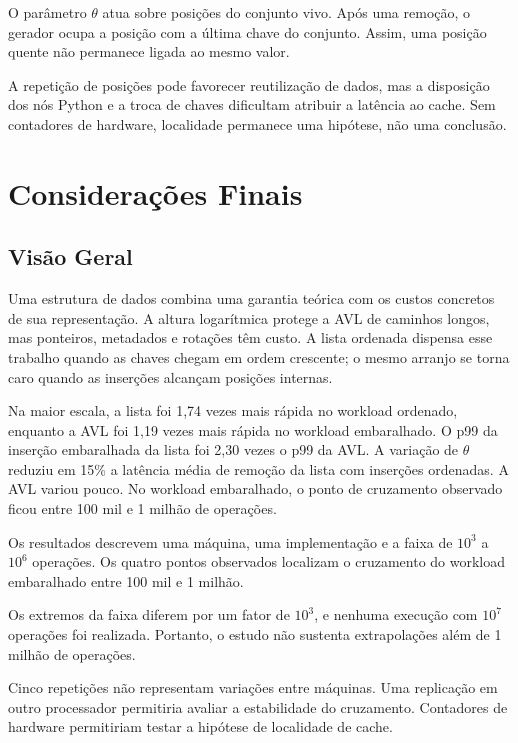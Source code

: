 \documentclass[12pt]{article}
\begin{document}
{O parâmetro $\theta$ atua sobre posições do conjunto vivo. Após uma remoção, o gerador ocupa a posição com a última chave do conjunto. Assim, uma posição quente não permanece ligada ao mesmo valor.}

{A repetição de posições pode favorecer reutilização de dados, mas a disposição dos nós Python e a troca de chaves dificultam atribuir a latência ao cache. Sem contadores de hardware, localidade permanece uma hipótese, não uma conclusão.}

\section{Considerações Finais}\label{sec:conclusion}

\subsection{Visão Geral}\label{sec:conclusion:overview}

{Uma estrutura de dados combina uma garantia teórica com os custos concretos de sua representação. A altura logarítmica protege a AVL de caminhos longos, mas ponteiros, metadados e rotações têm custo. A lista ordenada dispensa esse trabalho quando as chaves chegam em ordem crescente; o mesmo arranjo se torna caro quando as inserções alcançam posições internas.}

{Na maior escala, a lista foi 1,74 vezes mais rápida no workload ordenado, enquanto a AVL foi 1,19 vezes mais rápida no workload embaralhado. O p99 da inserção embaralhada da lista foi 2,30 vezes o p99 da AVL. A variação de $\theta$ reduziu em 15\% a latência média de remoção da lista com inserções ordenadas. A AVL variou pouco. No workload embaralhado, o ponto de cruzamento observado ficou entre 100 mil e 1 milhão de operações.}

{Os resultados descrevem uma máquina, uma implementação e a faixa de $10^3$ a $10^6$ operações. Os quatro pontos observados localizam o cruzamento do workload embaralhado entre 100 mil e 1 milhão.}

{Os extremos da faixa diferem por um fator de $10^3$, e nenhuma execução com $10^7$ operações foi realizada. Portanto, o estudo não sustenta extrapolações além de 1 milhão de operações.}

{Cinco repetições não representam variações entre máquinas. Uma replicação em outro processador permitiria avaliar a estabilidade do cruzamento. Contadores de hardware permitiriam testar a hipótese de localidade de cache.}
\end{document}
